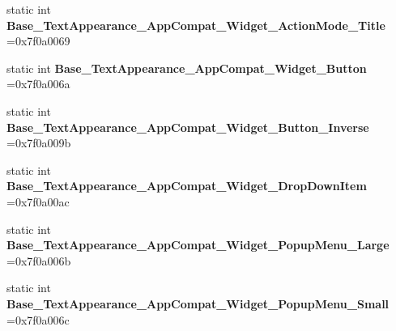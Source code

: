 \begin{DoxyCompactItemize}
\item 
\mbox{\label{classandroid_1_1support_1_1graphics_1_1drawable_1_1animated_1_1R_1_1style_a1c6b4e7d285e721f2ad0fc46f212b16d}} 
static int {\bfseries Base\+\_\+\+Text\+Appearance\+\_\+\+App\+Compat\+\_\+\+Widget\+\_\+\+Action\+Mode\+\_\+\+Title} =0x7f0a0069
\item 
\mbox{\label{classandroid_1_1support_1_1graphics_1_1drawable_1_1animated_1_1R_1_1style_aae9584c2ab00f087d02faf014cb0e07f}} 
static int {\bfseries Base\+\_\+\+Text\+Appearance\+\_\+\+App\+Compat\+\_\+\+Widget\+\_\+\+Button} =0x7f0a006a
\item 
\mbox{\label{classandroid_1_1support_1_1graphics_1_1drawable_1_1animated_1_1R_1_1style_aed9709ce47a03e1f25b7d57a9bab0e9e}} 
static int {\bfseries Base\+\_\+\+Text\+Appearance\+\_\+\+App\+Compat\+\_\+\+Widget\+\_\+\+Button\+\_\+\+Inverse} =0x7f0a009b
\item 
\mbox{\label{classandroid_1_1support_1_1graphics_1_1drawable_1_1animated_1_1R_1_1style_accdf51422f86d5d78aed4e602074555f}} 
static int {\bfseries Base\+\_\+\+Text\+Appearance\+\_\+\+App\+Compat\+\_\+\+Widget\+\_\+\+Drop\+Down\+Item} =0x7f0a00ac
\item 
\mbox{\label{classandroid_1_1support_1_1graphics_1_1drawable_1_1animated_1_1R_1_1style_a08b839927c54cc3162e8a49a74284007}} 
static int {\bfseries Base\+\_\+\+Text\+Appearance\+\_\+\+App\+Compat\+\_\+\+Widget\+\_\+\+Popup\+Menu\+\_\+\+Large} =0x7f0a006b
\item 
\mbox{\label{classandroid_1_1support_1_1graphics_1_1drawable_1_1animated_1_1R_1_1style_a42d40cff7f7ed9c03330ca13d393f4ae}} 
static int {\bfseries Base\+\_\+\+Text\+Appearance\+\_\+\+App\+Compat\+\_\+\+Widget\+\_\+\+Popup\+Menu\+\_\+\+Small} =0x7f0a006c
\item 
\mbox{\label{classandroid_1_1support_1_1graphics_1_1drawable_1_1animated_1_1R_1_1style_a52c24516aed400edc8aa7d7cd5fc5ecc}} 

\end{DoxyCompactItemize}
